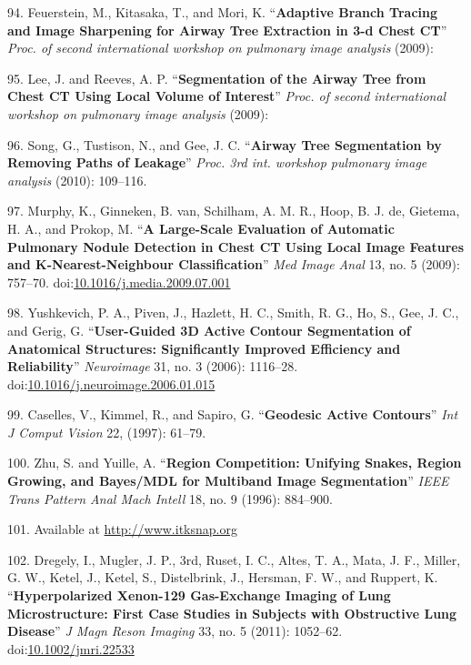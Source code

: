 \documentclass[11pt,]{article}
\begin{document}
\hypertarget{ref-Feuerstein:2009aa}{}
94. Feuerstein, M., Kitasaka, T., and Mori, K. ``\textbf{Adaptive Branch
Tracing and Image Sharpening for Airway Tree Extraction in 3-d Chest
CT}'' \emph{Proc. of second international workshop on pulmonary image
analysis} (2009):

\hypertarget{ref-Lee:2009aa}{}
95. Lee, J. and Reeves, A. P. ``\textbf{Segmentation of the Airway Tree
from Chest CT Using Local Volume of Interest}'' \emph{Proc. of second
international workshop on pulmonary image analysis} (2009):

\hypertarget{ref-Song:2010aa}{}
96. Song, G., Tustison, N., and Gee, J. C. ``\textbf{Airway Tree
Segmentation by Removing Paths of Leakage}'' \emph{Proc. 3rd int.
workshop pulmonary image analysis} (2010): 109--116.

\hypertarget{ref-Murphy:2009aa}{}
97. Murphy, K., Ginneken, B. van, Schilham, A. M. R., Hoop, B. J. de,
Gietema, H. A., and Prokop, M. ``\textbf{A Large-Scale Evaluation of
Automatic Pulmonary Nodule Detection in Chest CT Using Local Image
Features and K-Nearest-Neighbour Classification}'' \emph{Med Image Anal}
13, no. 5 (2009): 757--70.
doi:\href{https://doi.org/10.1016/j.media.2009.07.001}{10.1016/j.media.2009.07.001}

\hypertarget{ref-Yushkevich:2006aa}{}
98. Yushkevich, P. A., Piven, J., Hazlett, H. C., Smith, R. G., Ho, S.,
Gee, J. C., and Gerig, G. ``\textbf{User-Guided 3D Active Contour
Segmentation of Anatomical Structures: Significantly Improved Efficiency
and Reliability}'' \emph{Neuroimage} 31, no. 3 (2006): 1116--28.
doi:\href{https://doi.org/10.1016/j.neuroimage.2006.01.015}{10.1016/j.neuroimage.2006.01.015}

\hypertarget{ref-Caselles:1997aa}{}
99. Caselles, V., Kimmel, R., and Sapiro, G. ``\textbf{Geodesic Active
Contours}'' \emph{Int J Comput Vision} 22, (1997): 61--79.

\hypertarget{ref-Zhu:1996aa}{}
100. Zhu, S. and Yuille, A. ``\textbf{Region Competition: Unifying
Snakes, Region Growing, and Bayes/MDL for Multiband Image
Segmentation}'' \emph{IEEE Trans Pattern Anal Mach Intell} 18, no. 9
(1996): 884--900.

\hypertarget{ref-SnapWebsite}{}
101. Available at \url{http://www.itksnap.org}

\hypertarget{ref-Dregely:2011aa}{}
102. Dregely, I., Mugler, J. P., 3rd, Ruset, I. C., Altes, T. A., Mata,
J. F., Miller, G. W., Ketel, J., Ketel, S., Distelbrink, J., Hersman, F.
W., and Ruppert, K. ``\textbf{Hyperpolarized Xenon-129 Gas-Exchange
Imaging of Lung Microstructure: First Case Studies in Subjects with
Obstructive Lung Disease}'' \emph{J Magn Reson Imaging} 33, no. 5
(2011): 1052--62.
doi:\href{https://doi.org/10.1002/jmri.22533}{10.1002/jmri.22533}
\end{document}
